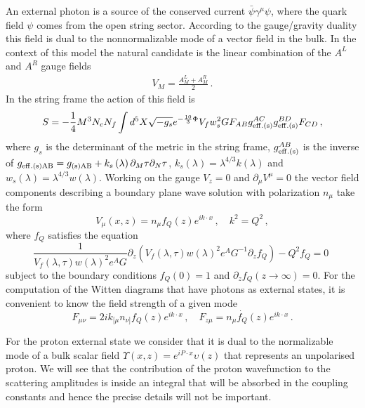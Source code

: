 \documentclass[a4paper,12pt]{article}
\begin{document}
An external photon is a source of the conserved current $\bar{\psi} \gamma^\mu \psi$, where the quark field $\psi$ comes from the open string sector. According to the gauge/gravity duality this field is dual to the nonnormalizable mode of a vector field in the bulk. In the context of this model the natural candidate is the linear combination of the $A^L$ and $A^R$ gauge fields
\begin{align}
V_M = \frac{A^L_M + A^R_M}{2} \,.
\end{align}
In the string frame the action of this field is
\begin{equation}
S = - \frac{1}{4} M^3 N_c N_f \int d^5 X \sqrt{-g_s} e^{-\frac{10}{3} \Phi} V_f w_s^2 G F_{AB}g^{AC}_{\rm{eff. (s)}}g^{BD}_{\rm{eff. (s)}}F_{CD} \, ,
\label{eq:VM_new_action_string_frame}
\end{equation}
where $g_s$ is the determinant of the metric in the string frame, $g^{AB}_{\rm{eff. (s)}}$ is the inverse of $g_{\rm{eff.(s)} AB} = g_{\rm{(s)} AB} +  k_s\left(\lambda\right) \partial_M \tau \partial_N \tau $, $k_s \left(\lambda\right) = \lambda^{4 / 3} k\left(\lambda\right) $ and $w_s \left(\lambda\right) = \lambda^{4 / 3} w\left(\lambda\right)$. Working on the gauge $V_z = 0$ and $\partial_\mu V^{\mu} = 0$ the vector field components describing a boundary plane wave solution with polarization $n_\mu$ take the form
\begin{equation}
V_\mu \left(x, z\right) = n_\mu f_Q \left(z\right) e^{i k \cdot x} \, , \quad k^2 = Q^2 \, ,
\end{equation}
where $f_Q$ satisfies the equation
\begin{equation}
\frac{1}{V_f(\lambda, \tau) w(\lambda)^2 e^A G} \partial_z (V_f(\lambda, \tau) w(\lambda)^2 e^A G^{-1} \partial_z f_Q) - Q^2 f_Q = 0 \, \,
\end{equation}
subject to the boundary conditions $f_Q\left(0\right) = 1$ and $\partial_z f_Q \left( z \to \infty \right) = 0$.
For the computation of the Witten diagrams that have photons as external states, it is convenient to know the field strength of a given mode
\begin{equation}
F_{\mu \nu} = 2 i k_{[ \mu} n_{\nu ]} f_Q (z) e^{i k \cdot x} \, , \quad F_{z \mu} = n_\mu \dot{f_Q} (z)e^{i k \cdot x} \, .
\label{eq:strength_tensor}
\end{equation}

For the proton external state we consider that it is dual to the normalizable mode of a bulk scalar field $\Upsilon\left(x, z\right) = e^{i P \cdot x} \upsilon\left(z\right)$ that represents an unpolarised proton. We will see that the contribution of the proton wavefunction to the scattering amplitudes is inside an integral that will be absorbed in the coupling constants and hence the precise details will not be important.
\end{document}
